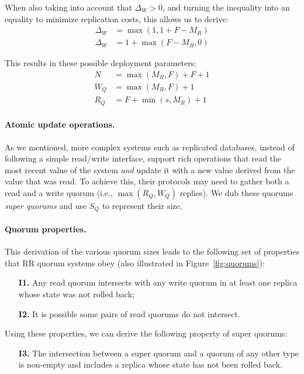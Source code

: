 When also taking into account that $\Delta_W > 0$, and turning
the inequality into an equality to minimize replication costs,
this allows us to derive:
\begin{align} \label{eq:deployment2}
  \Delta_W &=  \max(1,1 + F - M_R)\\
  \Delta_W &=  1 + \max(F - M_R,0)
\end{align}

This results in these possible deployment parameters:
\begin{align} \label{eq:deploymentfinal}
    N &= \max(M_R, F) + F + 1  \\
    W_Q &= \max(M_R, F) + 1 \\
    R_Q &= F + \min(s, M_R) + 1 \label{eq:proof3}
\end{align}

\paragraph{Atomic update operations.}
As we mentioned, more complex systems such as replicated
databases, instead of following a simple read/write interface,
support rich operations that read the most recent value of the
system \emph{and} update it with a new value derived from the
value that was read. To achieve this, their protocols may need to
gather both a read and a write quorum (i.e., $\max(R_Q, W_Q)$
replies). We dub these quorums \emph{super quorums} and use $S_Q$
to represent their size.

\paragraph{Quorum properties.} This derivation of the various quorum
sizes leads to the following set of properties that \ac{RR} quorum
systems obey (also illustrated in Figure~\ref{fig:quorums}):

\begin{enumerate}
    \item[\textbf{I1.}] Any read quorum intersects with any write
        quorum in at least one replica whose state was not rolled
        back;
    \item[\textbf{I2.}] It is possible some pairs of read quorums
        do not intersect.
\end{enumerate}

Using these properties, we can derive the following
property of super quorums:

\begin{enumerate}
    \item[\textbf{I3.}] The intersection between a super quorum
        and a quorum of any other type is non-empty and includes
        a replica whose state has not been rolled back.
\end{enumerate}

